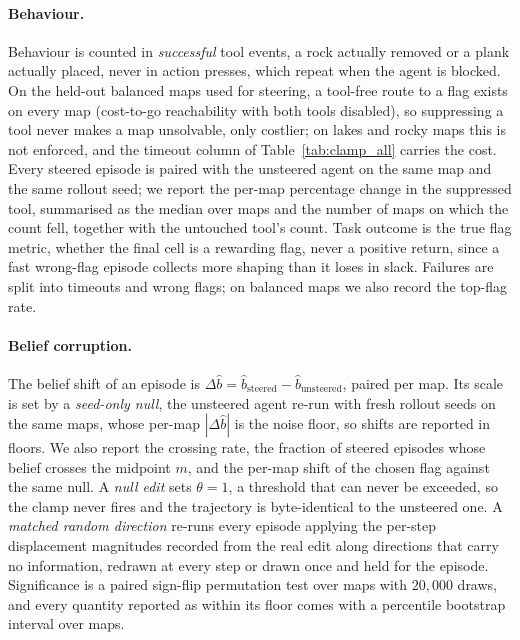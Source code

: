 \paragraph{Behaviour.}
Behaviour is counted in \emph{successful} tool events, a rock actually removed
or a plank actually placed, never in action presses, which repeat when the
agent is blocked. On the held-out balanced maps used for steering, a
tool-free route to a flag exists on every map (cost-to-go reachability with
both tools disabled), so suppressing a tool never makes a map unsolvable,
only costlier; on lakes and rocky maps this is not enforced, and the timeout
column of Table~\ref{tab:clamp_all} carries the cost. Every steered episode is paired with the unsteered agent on
the same map and the same rollout seed; we report the per-map percentage
change in the suppressed tool, summarised as the median over maps and the
number of maps on which the count fell, together with the untouched tool's
count. Task outcome is the true flag metric, whether the final cell is a
rewarding flag, never a positive return, since a fast wrong-flag episode
collects more shaping than it loses in slack. Failures are split into timeouts
and wrong flags; on balanced maps we also record the top-flag rate.

\paragraph{Belief corruption.}
The belief shift of an episode is $\Delta\hat b=\hat b_{\text{steered}}-\hat b_{\text{unsteered}}$, paired per map. Its scale is set by a \emph{seed-only
null}, the unsteered agent re-run with fresh rollout seeds on the same maps,
whose per-map $|\Delta\hat b|$ is the noise floor, so shifts are reported in
floors. We also report the crossing rate, the fraction of steered episodes
whose belief crosses the midpoint $m$, and the per-map shift of the chosen
flag against the same null. A \emph{null edit} sets $\theta=1$, a threshold that can
never be exceeded, so the clamp never fires and the trajectory is
byte-identical to the unsteered one. A \emph{matched random
direction} re-runs every episode applying the per-step displacement
magnitudes recorded from the real edit along directions that carry no
information, redrawn at every step or drawn once and held for the episode.
Significance is a paired sign-flip permutation test over maps with $20{,}000$
draws, and every quantity reported as within its floor comes with a
percentile bootstrap interval over maps.

